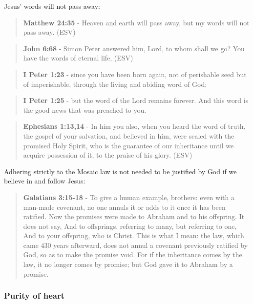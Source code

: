 \documentclass[11pt]{article}
\begin{document}
Jesus' words will not pass away:

\begin{quote}
\textbf{Matthew 24:35} - Heaven and earth will pass away, but my words will not pass away.  (ESV)
\end{quote}

\begin{quote}
\textbf{John 6:68} -  Simon Peter answered him, Lord, to whom shall we go?  You have the words of eternal life,  (ESV)
\end{quote}

\begin{quote}
\textbf{I Peter 1:23} - since you have been born again, not of perishable seed but of imperishable, through the living and abiding word of God;
\end{quote}

\begin{quote}
\textbf{I Peter 1:25} - but the word of the Lord remains forever. And this word is the good news that was preached to you.
\end{quote}

\begin{quote}
\textbf{Ephesians 1:13,14} -  In him you also, when you heard the word of truth, the gospel of your salvation, and believed in him, were sealed with the promised Holy Spirit, who is the guarantee of our inheritance until we acquire possession of it, to the praise of his glory.  (ESV)
\end{quote}

Adhering strictly to the Mosaic law is not needed to be justified by God if we believe in and follow Jesus:

\begin{quote}
\textbf{Galatians 3:15-18} - To give a human example, brothers: even with a man-made covenant, no one annuls it or adds to it once it has been ratified. Now the promises were made to Abraham and to his offspring. It does not say, And to offsprings, referring to many, but referring to one, And to your offspring, who is Christ. This is what I mean: the law, which came 430 years afterward, does not annul a covenant previously ratified by God, so as to make the promise void. For if the inheritance comes by the law, it no longer comes by promise; but God gave it to Abraham by a promise.
\end{quote}

\subsubsection{Purity of heart}
\label{sec:orgeba99d2}
\end{document}
